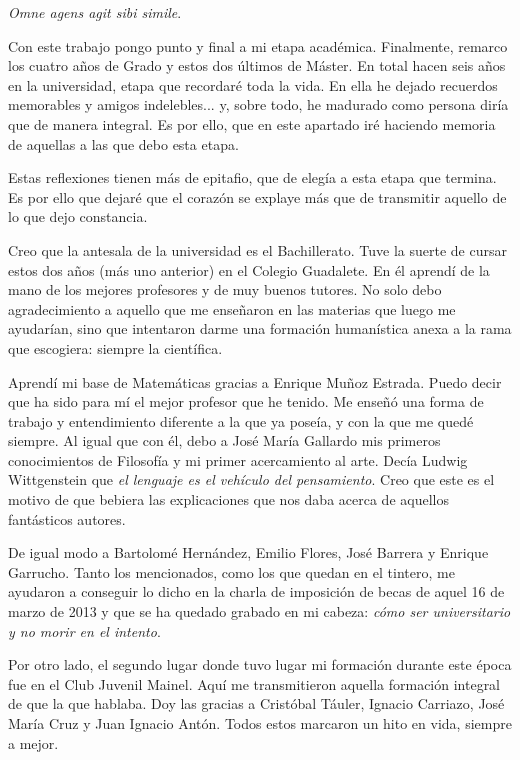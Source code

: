 
\hfill \textit{Omne agens agit sibi simile}.
\newline

Con este trabajo pongo punto y final a mi etapa académica. Finalmente, remarco los cuatro años de Grado y estos dos últimos de Máster. En total hacen seis años en la universidad, etapa que recordaré toda la vida. En ella he dejado recuerdos memorables y amigos indelebles... y, sobre todo, he madurado como persona diría que de manera integral. Es por ello, que en este apartado iré haciendo memoria de aquellas a las que debo esta etapa.

Estas reflexiones tienen más de epitafio, que de elegía a esta etapa que termina. Es por ello que dejaré que el corazón se explaye más que de transmitir aquello de lo que dejo constancia.

Creo que la antesala de la universidad es el Bachillerato. Tuve la suerte de cursar estos dos años (más uno anterior) en el Colegio Guadalete. En él aprendí de la mano de los mejores profesores y de muy buenos tutores. No solo debo agradecimiento a aquello que me enseñaron en las materias que luego me ayudarían, sino que intentaron darme una formación humanística anexa a la rama que escogiera: siempre la científica.

Aprendí mi base de Matemáticas gracias a Enrique Muñoz Estrada. Puedo decir que ha sido para mí el mejor profesor que he tenido. Me enseñó una forma de trabajo y entendimiento diferente a la que ya poseía, y con la que me quedé siempre. Al igual que con él, debo a José María Gallardo mis primeros conocimientos de Filosofía y mi primer acercamiento al arte. Decía Ludwig Wittgenstein que \textit{el lenguaje es el vehículo del pensamiento}. Creo que este es el motivo de que bebiera las explicaciones que nos daba acerca de aquellos fantásticos autores.

De igual modo a Bartolomé Hernández, Emilio Flores, José Barrera y Enrique Garrucho. Tanto los mencionados, como los que quedan en el tintero, me ayudaron a conseguir lo dicho en la charla de imposición de becas de aquel 16 de marzo de 2013 y que se ha quedado grabado en mi cabeza: \textit{cómo ser universitario y no morir en el intento}.

Por otro lado, el segundo lugar donde tuvo lugar mi formación durante este época fue en el Club Juvenil Mainel. Aquí me transmitieron aquella formación integral de que la que hablaba. Doy las gracias a Cristóbal Táuler, Ignacio Carriazo, José María Cruz y Juan Ignacio Antón. Todos estos marcaron un hito en vida, siempre a mejor.


